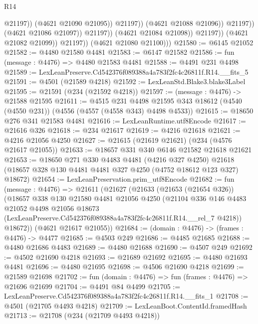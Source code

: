 \begin{lexlean}{R14}
\begin{coremodule}
                                          @21197))
                                      (@4621 @21090 @21095))
                                    @21197))
                                (@4621 @21088 @21096))
                              @21197))
                          (@4621 @21086 @21097))
                        @21197))
                    (@4621 @21084 @21098))
                  @21197))
              (@4621 @21082 @21099))
            @21197))
        (@4621 @21080 @21100)))
@21580 := @6145 @21052
@21582 := @4480 @21580 @4481
@21583 := @6147 @21582
@21586 := fun (message : @4476) => @4480 @21583 @4481
@21588 := @4491 @231 @4498
@21589 := LexLeanPreserve.Cd542376f089388a4a783f2fc4c26811f.R14.__fits_5
@21591 := @4501 (@21589 @4218)
@21592 := LexLeanStd.Blake3.blake3Label
@21595 := @21591 (@234 (@21592 @4218))
@21597 := (message : @4476) -> @21588 @21595
@21611 := @4515
    @231
    @4498
    @21595
    @343
    @18612
    (@4540 (@4550 @231))
    (@4556 (@4557 (@4558 @343) @4498 @4533))
@21615 := @18650 @276 @341 @21583 @4481
@21616 := LexLeanRuntime.utf8Encode
@21617 := @21616 @326
@21618 := @234 @21617
@21619 := @4216 @21618
@21621 := @4216 @21056 @4250
@21627 := @21615 (@21619 @21621) (@234 (@4576 @21617 @21055))
@21633 := @18657 @331 @340 @6146 @21582 @21618 @21621
@21653 := @18650
    @271
    @330
    @4483
    @4481
    (@4216 @327 @4250)
    @21618
    (@18657 @328 @130 @4481 @4481 @327 @4250 (@4752 @18612 @123 @327) @18672)
@21654 := LexLeanPreservation.prim_utf8Encode
@21682 := fun (message : @4476) =>
  @21611
    (@21627
      (@21633
        (@21653 (@21654 @326))
        (@18657
          @338
          @130
          @21580
          @4481
          @21056
          @4250
          (@21104
            @336
            @146
            @4483
            @21052
            @4498
            @21056
            @18673
            (LexLeanPreserve.Cd542376f089388a4a783f2fc4c26811f.R14.__rel_7 @4218))
          @18672))
      (@4621 @21617 @21055))
@21684 := (domain : @4476) -> (frames : @4476) -> @4477
@21685 := @4503 @249
@21686 := @4485 @21685
@21688 := @4480 @21686 @4483
@21689 := @4480 @21688
@21690 := @4507 @249
@21692 := @4502 @21690 @4218
@21693 := @21689 @21692
@21695 := @4480 @21693 @4481
@21696 := @4480 @21695
@21698 := @4506 @21690 @4218
@21699 := @21589 @21698
@21702 := fun (domain : @4476) => fun (frames : @4476) => @21696 @21699
@21704 := @4491 @84 @4499
@21705 := LexLeanPreserve.Cd542376f089388a4a783f2fc4c26811f.R14.__fits_1
@21708 := @4501 (@21705 @4493 @4218)
@21709 := LexLeanBoot.ContentId.framedHash
@21713 := @21708 (@234 (@21709 @4493 @4218))

\end{coremodule}
\end{lexlean}

